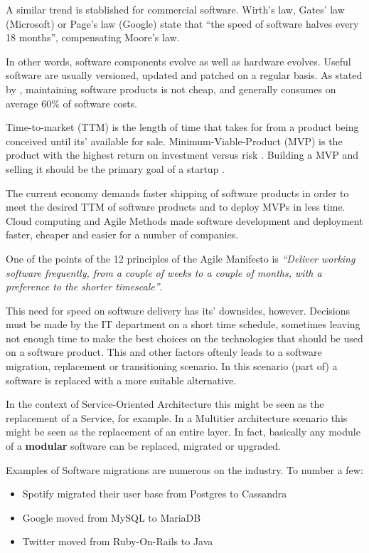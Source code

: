 A similar trend is stablished for commercial software. Wirth's law, Gates' law (Microsoft) or Page's law (Google) state that ``the speed of software halves every 18 months'', compensating Moore's law. \cite{wirth1995a}\cite{brinbreaking}

In other words, software components evolve as well as hardware evolves. Useful software are usually versioned, updated and patched on a regular basis. As stated by \cite{922739}, maintaining software products is not cheap, and generally consumes on average 60\% of software costs.

Time-to-market (TTM) is the length of time that takes for from a product being conceived until its' available for sale. Minimum-Viable-Product (MVP) is the product with the highest return on investment versus risk \cite{blank2013four}. Building a MVP and selling it should be the primary goal of a startup \cite{blank2013four}. 

The current economy demands faster shipping of software products in order to meet the desired TTM of software products and to deploy MVPs in less time. Cloud computing and Agile Methods made software development and deployment faster, cheaper and easier for a number of companies. 

One of the points of the 12 principles of the Agile Manifesto \cite{fowler2001agile} is \textit{``Deliver working software frequently, from a couple of weeks to a couple of months, with a preference to the shorter timescale''}.

This need for speed on software delivery has its' downsides, however. Decisions must be made by the IT department on a short time schedule, sometimes leaving not enough time to make the best choices on the technologies that should be used on a software product. This and other factors oftenly leads to a software migration, replacement or transitioning scenario. In this scenario (part of) a software is replaced with a more suitable alternative.

In the context of Service-Oriented Architecture this might be seen as the replacement of a Service, for example. In a Multitier architecture scenario this might be seen as the replacement of an entire layer. In fact, basically any module of a \textbf{modular} software can be replaced, migrated or upgraded. 

Examples of Software migrations are numerous on the industry. To number a few: 
\begin{itemize}
\item{Spotify migrated their user base from Postgres to Cassandra\cite{spotifyEngineering}}
\item{Google moved from MySQL to MariaDB\cite{googleMariaDB}}
\item{Twitter moved from Ruby-On-Rails to Java\cite{twitterRails}}

\end{itemize}


